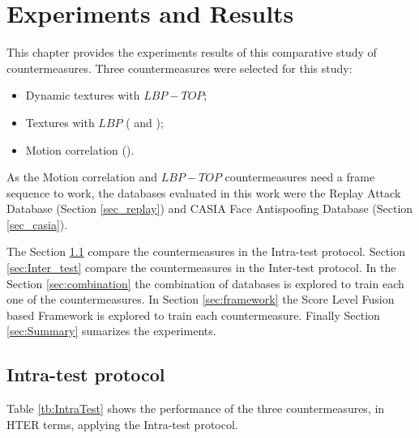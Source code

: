 \chapter{Experiments and Results}
\label{chap:Experiments_Results}

This chapter provides the experiments results of this comparative study of countermeasures. Three countermeasures were selected for this study:
\begin{itemize}
        \item Dynamic textures with $LBP-TOP$;
        \item Textures with $LBP$ (\cite{ChingovskaBIOSIG2012} and \cite{maatta2011face});
        \item Motion correlation (\cite{AnjosIJCB2011}).
\end{itemize}
As the Motion correlation and $LBP-TOP$ countermeasures need a frame sequence to work, the databases evaluated in this work were the Replay Attack Database (Section \ref{sec_replay}) and CASIA Face Antispoofing Database (Section \ref{sec_casia}).

The Section \ref{sec:Intra_test} compare the countermeasures in the Intra-test protocol. Section \ref{sec:Inter_test} compare the countermeasures in the Inter-test protocol. In the Section \ref{sec:combination} the combination of databases is explored to train each one of the countermeasures. In Section \ref{sec:framework} the Score Level Fusion based Framework is explored to train each countermeasure. Finally Section \ref{sec:Summary} sumarizes the experiments.

\section{Intra-test protocol}
\label{sec:Intra_test}

Table \ref{tb:IntraTest} shows the performance of the three countermeasures, in HTER terms, applying the Intra-test protocol.

